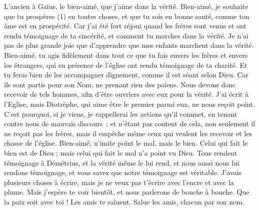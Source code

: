 \BFont
\begin{multicols}{2}
\VerseOne{}L'ancien à Gaïus, le bien-aimé, que j'aime dans la vérité.
Bien-aimé, je souhaite que tu prospères (1) en toutes choses, et que tu sois en bonne santé, comme ton âme est en prospérité.
Car j’ai été fort réjoui quand les frères sont venus et ont rendu témoignage de ta sincérité, et comment tu marches dans la vérité.
Je n'ai pas de plus grande joie que d’apprendre que mes enfants marchent dans la vérité.
Bien-aimé, tu agis fidèlement dans tout ce que tu fais envers les frères et envers les étrangers,
qui en présence de l'église ont rendu témoignage de ta charité. Et tu feras bien de les accompagner dignement, comme il est séant selon Dieu.
Car ils sont partis pour son Nom, ne prenant rien des païens.
Nous devons donc recevoir de tels hommes, afin d’être ouvriers avec eux pour la vérité.
J'ai écrit à l'Eglise, mais Diotrèphe, qui aime être le premier parmi eux, ne nous reçoit point.
C'est pourquoi, si je viens, je rappellerai les actions qu'il commet, en tenant contre nous de mauvais discours ; et n'étant pas content de cela, non seulement il ne reçoit pas les frères, mais il empêche même ceux qui veulent les recevoir et les chasse de l'église.
Bien-aimé, n'imite point le mal, mais le bien. Celui qui fait le bien est de Dieu ; mais celui qui fait le mal n'a point vu Dieu.
Tous rendent témoignage à Démétrius, et la vérité même le lui rend, et nous aussi nous lui rendons témoignage, et vous savez que notre témoignage est véritable.
J'avais plusieurs choses à écrire, mais je ne veux pas t'écrire avec l'encre et avec la plume.
Mais j'espère te voir bientôt, et nous parlerons de bouche à bouche.
Que la paix soit avec toi ! Les amis te saluent. Salue les amis, chacun par son nom.
\PPE{}
\end{multicols}